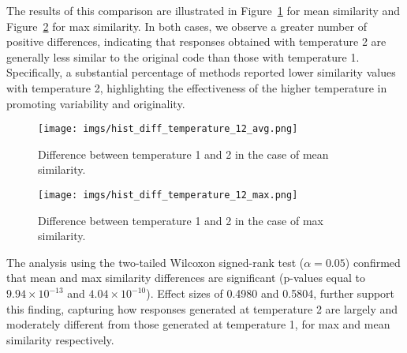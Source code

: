 The results of this comparison are illustrated in Figure~\ref{fig:hist_diff_temperature_12_avg} for mean similarity and Figure~\ref{fig:hist_diff_temperature_12_max} for max similarity.
In both cases, we observe a greater number of positive differences, indicating that responses obtained with temperature 2 are generally less similar to the original code than those with temperature 1. Specifically, a substantial percentage of methods reported lower similarity values with temperature 2, highlighting the effectiveness of the higher temperature in promoting variability and originality.





\begin{figure}
    \centering
    \texttt{[image: imgs/hist\_diff\_temperature\_12\_avg.png]}
    \vspace{-10pt} 
    
    \caption{Difference between temperature 1 and 2 in the case of mean similarity.}
    \label{fig:hist_diff_temperature_12_avg}
\end{figure}

\begin{figure}
    \centering
    \texttt{[image: imgs/hist\_diff\_temperature\_12\_max.png]}
    \vspace{-10pt} 
    
    \caption{Difference between temperature 1 and 2 in the case of max similarity.}
    \label{fig:hist_diff_temperature_12_max}
\end{figure}

The analysis using the two-tailed Wilcoxon signed-rank test ($\alpha = 0.05$) confirmed that mean and max similarity differences are significant (p-values equal to $9.94 \times 10^{-13}$ and $4.04 \times 10^{-10}$). Effect sizes of 0.4980 and 0.5804, further support this finding, capturing how responses generated at temperature 2 are largely and moderately different from those generated at temperature 1, for max and mean similarity respectively.   


